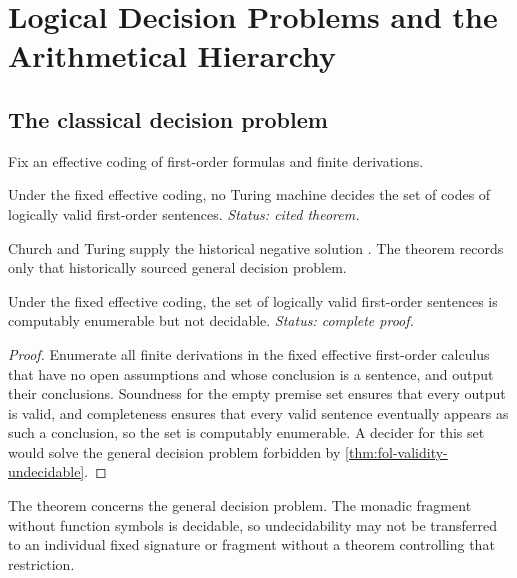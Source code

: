 \chapter{Logical Decision Problems and the Arithmetical Hierarchy}
\label{ch:decision-hierarchy}

\section{The classical decision problem}
\label{sec:decision-hierarchy-01}

Fix an effective coding of first-order formulas and finite derivations.

\begin{theorem}
\label{thm:fol-validity-undecidable}
Under the fixed effective coding, no Turing machine decides the set of
codes of logically valid first-order sentences.
\textit{Status: cited theorem.}
\end{theorem}

Church and Turing supply the historical negative solution
\cite{Church1936,Turing1937}.  The theorem records only that historically
sourced general decision problem.

\begin{corollary}
Under the fixed effective coding, the set of logically valid first-order
sentences is computably enumerable but not decidable.
\textit{Status: complete proof.}
\end{corollary}

\begin{proof}
Enumerate all finite derivations in the fixed effective first-order
calculus that have no open assumptions and whose conclusion is a sentence,
and output their conclusions.  Soundness for the empty premise set ensures
that every output is valid, and completeness ensures that every valid
sentence eventually appears as such a conclusion, so the
set is computably enumerable.  A decider for this set would solve the general
decision problem forbidden by \cref{thm:fol-validity-undecidable}.
\end{proof}

\begin{warning}
The theorem concerns the general decision problem.  The monadic fragment
without function symbols is decidable, so undecidability may not be transferred
to an individual fixed signature or fragment without a theorem controlling
that restriction.
\end{warning}

